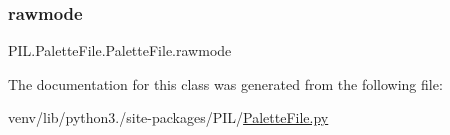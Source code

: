 \mbox{\label{classPIL_1_1PaletteFile_1_1PaletteFile_a5b174f18890bfaa897b7b30cc07cba08}} 
\subsubsection{\texorpdfstring{rawmode}{rawmode}}
{\footnotesize\ttfamily P\+I\+L.\+Palette\+File.\+Palette\+File.\+rawmode\hspace{0.3cm}{\ttfamily [static]}}



The documentation for this class was generated from the following file\+:\begin{DoxyCompactItemize}
\item 
venv/lib/python3./site-\/packages/\+P\+I\+L/\hyperlink{PaletteFile_8py}{Palette\+File.\+py}\end{DoxyCompactItemize}
